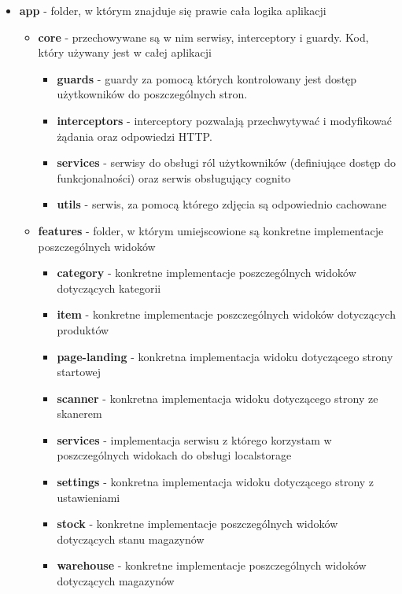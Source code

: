\documentclass[../../main.tex]{subfiles}
\begin{document}
    \begin{itemize}
        \item \textbf{app} - folder, w którym znajduje się prawie cała logika aplikacji
        \begin{itemize}
            \item \textbf{core} - przechowywane są w nim serwisy, interceptory i guardy. Kod, który używany jest w całej aplikacji
            \begin{itemize}
                \item \textbf{guards} -  guardy za pomocą których kontrolowany jest dostęp użytkowników do poszczególnych stron. 
                \item \textbf{interceptors} - interceptory pozwalają przechwytywać i modyfikować żądania oraz odpowiedzi HTTP. 
                \item \textbf{services} - serwisy do obsługi ról użytkowników (definiujące dostęp do funkcjonalności) oraz serwis obsługujący cognito
                \item \textbf{utils} - serwis, za pomocą którego zdjęcia są odpowiednio cachowane
            \end{itemize}
            \item \textbf{features} - folder, w którym umiejscowione są konkretne implementacje poszczególnych widoków
            \begin{itemize}
                \item \textbf{category} - konkretne implementacje poszczególnych widoków dotyczących kategorii
                \item \textbf{item} - konkretne implementacje poszczególnych widoków dotyczących produktów
                \item \textbf{page-landing} - konkretna implementacja widoku dotyczącego strony startowej
                \item \textbf{scanner} - konkretna implementacja widoku dotyczącego strony ze skanerem
                \item \textbf{services} - implementacja serwisu z którego korzystam w poszczególnych widokach do obsługi localstorage
                \item \textbf{settings} - konkretna implementacja widoku dotyczącego strony z ustawieniami
                \item \textbf{stock} - konkretne implementacje poszczególnych widoków dotyczących stanu magazynów
                \item \textbf{warehouse} - konkretne implementacje poszczególnych widoków dotyczących magazynów

\end{itemize}
\end{itemize}
\end{itemize}
\end{document}
